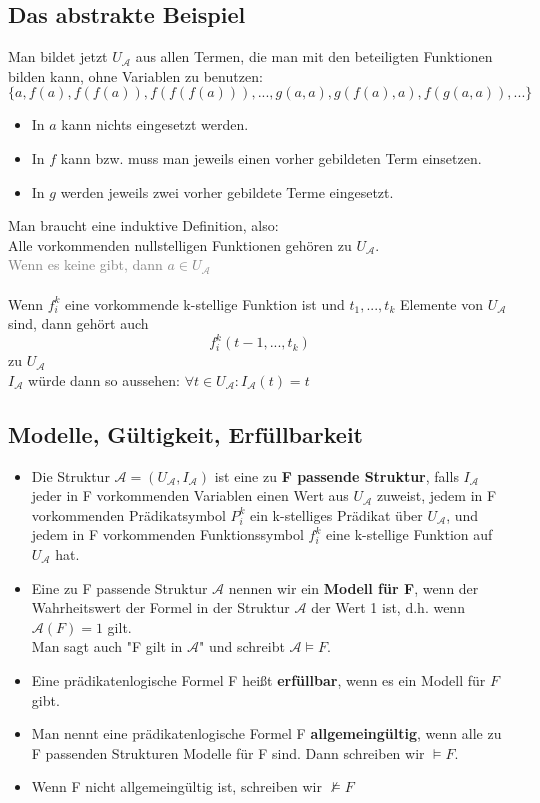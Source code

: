\documentclass{article}
\begin{document}
	\subsection{Das abstrakte Beispiel}
	Man bildet jetzt $U_\mathcal{A}$ aus allen Termen, die man mit den beteiligten Funktionen bilden kann, ohne Variablen zu benutzen: \\
	\[\{a, f(a), f(f(a)), f(f(f(a))),...,g(a,a), g(f(a),a),f(g(a,a)),...\}\]
	\begin{itemize}
		\item In $a$ kann nichts eingesetzt werden.
		\item In $f$ kann bzw. muss man jeweils einen vorher gebildeten Term einsetzen.
		\item In $g$ werden jeweils zwei vorher gebildete Terme eingesetzt.
	\end{itemize}
	Man braucht eine induktive Definition, also: \\
	Alle vorkommenden nullstelligen Funktionen gehören zu $U_\mathcal{A}$.\\
	\textcolor{gray}{Wenn es keine gibt, dann $a \in U_\mathcal{A}$} \\
	\\
	Wenn $f^k_i$ eine vorkommende k-stellige Funktion ist und $t_1,..., t_k$ Elemente von $U_\mathcal{A}$ sind, dann gehört auch
	\[f^k_i(t-1,...,t_k)\]
	zu $U_\mathcal{A}$
	\\
	$I_\mathcal{A}$ würde dann so aussehen: $\forall t \in U_\mathcal{A}: I_\mathcal{A}(t) = t$
	\subsection{Modelle, Gültigkeit, Erfüllbarkeit}
	\begin{itemize}
		\item Die Struktur $\mathcal{A} = (U_\mathcal{A}, I_\mathcal{A})$ ist eine zu \textbf{F passende Struktur}, falls $I_\mathcal{A}$ jeder in F vorkommenden Variablen einen Wert aus $U_\mathcal{A}$ zuweist, jedem in F vorkommenden Prädikatsymbol $P^k_i$ ein k-stelliges Prädikat über $U_\mathcal{A}$, und jedem in F vorkommenden Funktionssymbol $f^k_i$ eine k-stellige Funktion auf $U_\mathcal{A}$ hat.
		\item Eine zu F passende Struktur $\mathcal{A}$ nennen wir ein \textbf{Modell für F}, wenn der Wahrheitswert der Formel in der Struktur $\mathcal{A}$ der Wert 1 ist, d.h. wenn $\mathcal{A}(F) = 1$ gilt. \\
		Man sagt auch "F gilt in $\mathcal{A}$" und schreibt $\mathcal{A} \vDash F$.
		\item Eine prädikatenlogische Formel F heißt \textbf{erfüllbar}, wenn es ein Modell für $F$ gibt.
		\item Man nennt eine prädikatenlogische Formel F \textbf{allgemeingültig}, wenn alle zu F passenden Strukturen Modelle für F sind. Dann schreiben wir $\vDash F$.
		\item Wenn F nicht allgemeingültig ist, schreiben wir $\nvDash F$
	\end{itemize}
\end{document}
